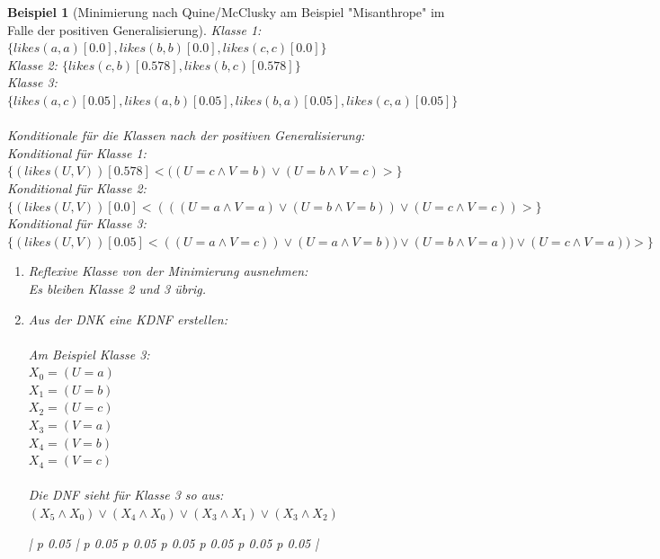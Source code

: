 \documentclass[a4paper, 11pt]{book}
\newtheorem{Bsp}{Beispiel}[section]
\newlength{\currentLongTableWidth} %
\begin{document}
\begin{Bsp}[Minimierung nach Quine/McClusky am Beispiel "{}Misanthrope"{} im Falle der positiven Generalisierung]
	Klasse 1: $ \{likes(a,a)[0.0], likes(b,b)[0.0], likes(c,c)[0.0]\} $\\
	Klasse 2: $ \{likes(c,b)[0.578], likes(b,c)[0.578]\} $\\
	Klasse 3: $ \{likes(a,c)[0.05], likes(a,b)[0.05], likes(b,a)[0.05], likes(c,a)[0.05]\} $\\
	\\
	\noindent
	Konditionale für die Klassen nach der positiven Generalisierung:\\
	Konditional für Klasse 1: $ \{(likes(U,V))[0.578] <((U = c \land V = b) \lor (U = b \land V = c)>\} $\\
	Konditional für Klasse 2: $ \{(likes(U,V))[0.0] <(((U = a \land V = a) \lor (U = b \land V = b)) \lor (U = c \land V = c)) >\} $\\
	Konditional für Klasse 3: $ \{(likes(U,V))[0.05] <((U = a \land V = c)) \lor (U = a \land V = b)) \lor (U = b \land V = a)) \lor (U = c \land V = a))>\} $\\
	\begin{enumerate}
		\item Reflexive Klasse von der Minimierung ausnehmen:\\
		Es bleiben Klasse 2 und 3 übrig.	
		\item Aus der DNK eine KDNF erstellen:\\\\
		Am Beispiel Klasse 3:\\
		$ X_0 = (U = a) $\\
		$ X_1 = (U = b) $\\
		$ X_2 = (U = c) $\\
		$ X_3 = (V = a) $\\
		$ X_4 = (V = b) $\\
		$ X_4 = (V = c) $\\
		\\
		\noindent
		Die DNF sieht für Klasse 3 so aus:\\
		$ (X_5 \land X_0) \lor (X_4 \land X_0) \lor (X_3 \land X_1) \lor (X_3 \land X_2) $
		\begin{footnotesize}
			\begin{longtable}{ |  p {0.05\currentLongTableWidth} | p {0.05\currentLongTableWidth}  p {0.05\currentLongTableWidth}  p {0.05\currentLongTableWidth} p {0.05\currentLongTableWidth} p {0.05\currentLongTableWidth} p {0.05\currentLongTableWidth} |}
				\hline
				\\

\end{longtable}
\end{footnotesize}
\end{enumerate}
\end{Bsp}
\end{document}
